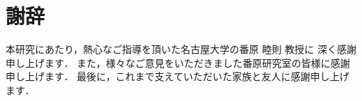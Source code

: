 \chapter*{謝辞}

本研究にあたり，熱心なご指導を頂いた名古屋大学の番原 睦則 教授に
深く感謝申し上げます．
また，様々なご意見をいただきました番原研究室の皆様に感謝申し上げます．
最後に，これまで支えていただいた家族と友人に感謝申し上げます．

